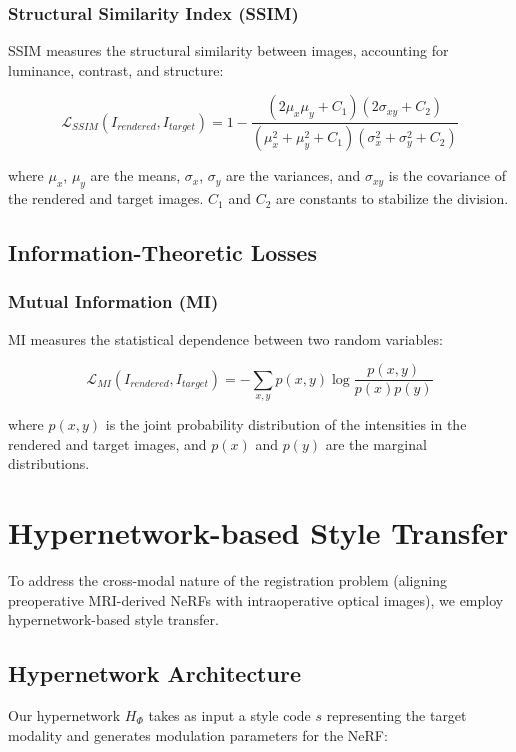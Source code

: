 \subsubsection{Structural Similarity Index (SSIM)}
SSIM \cite{wang2004image} measures the structural similarity between images, accounting for luminance, contrast, and structure:

\begin{equation}
\mathcal{L}_{SSIM}(I_{rendered}, I_{target}) = 1 - \frac{(2\mu_x\mu_y + C_1)(2\sigma_{xy} + C_2)}{(\mu_x^2 + \mu_y^2 + C_1)(\sigma_x^2 + \sigma_y^2 + C_2)}
\end{equation}

where $\mu_x$, $\mu_y$ are the means, $\sigma_x$, $\sigma_y$ are the variances, and $\sigma_{xy}$ is the covariance of the rendered and target images. $C_1$ and $C_2$ are constants to stabilize the division.

\subsection{Information-Theoretic Losses}
\subsubsection{Mutual Information (MI)}
MI measures the statistical dependence between two random variables:

\begin{equation}
\mathcal{L}_{MI}(I_{rendered}, I_{target}) = -\sum_{x,y} p(x,y) \log \frac{p(x,y)}{p(x)p(y)}
\end{equation}

where $p(x,y)$ is the joint probability distribution of the intensities in the rendered and target images, and $p(x)$ and $p(y)$ are the marginal distributions.

\section{Hypernetwork-based Style Transfer}
To address the cross-modal nature of the registration problem (aligning preoperative MRI-derived NeRFs with intraoperative optical images), we employ hypernetwork-based style transfer.

\subsection{Hypernetwork Architecture}
Our hypernetwork $H_\Phi$ takes as input a style code $s$ representing the target modality and generates modulation parameters for the NeRF:

